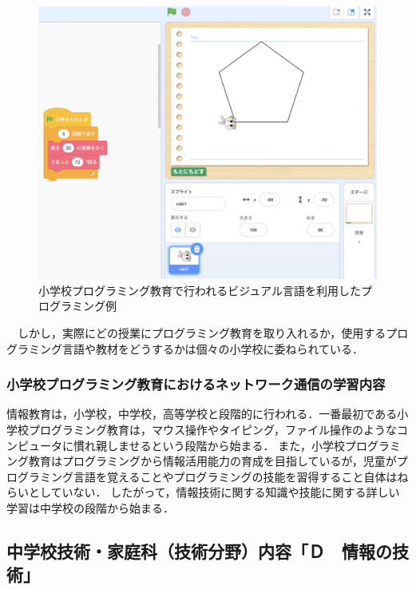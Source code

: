 \documentclass[12pt,a4j,titlepage]{ltjsarticle}
\begin{document}
\begin{figure}[h]
\centering
\includegraphics[clip,width=150mm]{figures/syoupro.pdf}
\caption[ビジュアル言語を利用したプログラミング例]{小学校プログラミング教育で行われるビジュアル言語を利用したプログラミング例\linebreak}
\label{fig:syoupro}
\end{figure}

　しかし，実際にどの授業にプログラミング教育を取り入れるか，使用するプログラミング言語や教材をどうするかは個々の小学校に委ねられている．
\subsubsection{小学校プログラミング教育におけるネットワーク通信の学習内容}
情報教育は，小学校，中学校，高等学校と段階的に行われる．一番最初である小学校プログラミング教育は，マウス操作やタイピング，ファイル操作のようなコンピュータに慣れ親しませるという段階から始まる．
また，小学校プログラミング教育はプログラミングから情報活用能力の育成を目指しているが，児童がプログラミング言語を覚えることやプログラミングの技能を習得すること自体はねらいとしていない．
したがって，情報技術に関する知識や技能に関する詳しい学習は中学校の段階から始まる．

\clearpage

\subsection{中学校技術・家庭科（技術分野）内容「Ｄ　情報の技術」}
\end{document}
